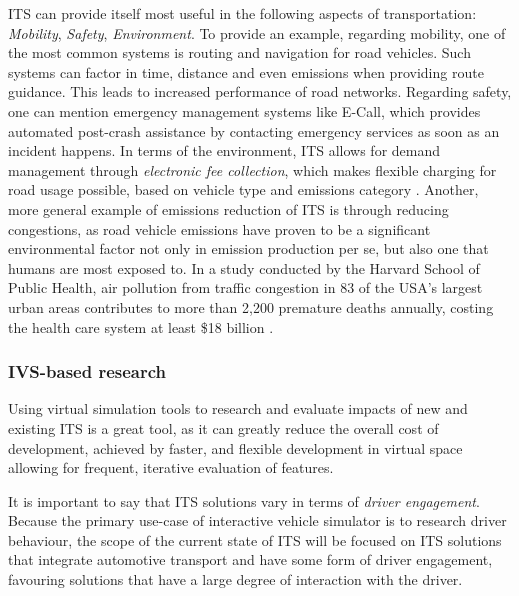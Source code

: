 \documentclass[main.tex]{subfiles}
\begin{document}
ITS can provide itself most useful in the following aspects of transportation: 
\emph{Mobility}, \emph{Safety}, \emph{Environment}. To provide an example, regarding mobility, 
one of the most common systems is routing and navigation for road vehicles. Such systems can 
factor in time, distance and even emissions when providing route guidance. This leads to 
increased performance of road networks. Regarding safety, one can mention emergency management
systems like E-Call, which provides automated post-crash assistance by contacting emergency
services as soon as an incident happens. In terms of the environment, 
ITS allows for demand management through \emph{electronic fee collection}, which makes flexible 
charging for road usage possible, based on vehicle type and emissions category \cite{Commision2022}.
Another, more general example of emissions reduction of ITS is through reducing congestions, as road vehicle 
emissions have proven to be a significant environmental factor not only in emission production
per se, but also one that humans are most exposed to. In a study conducted by the Harvard
School of Public Health, air pollution from traffic congestion in 83 of the USA's largest urban
areas contributes to more than 2,200 premature deaths annually, costing the health care system at
least \$18 billion \cite{Levy2011}.

\subsubsection{IVS-based research}

Using virtual simulation tools to research and evaluate impacts of new and existing ITS 
is a great tool, as it can greatly reduce the overall cost of development, achieved by faster, 
and flexible development in virtual space allowing for frequent, iterative evaluation of features.

It is important to say that ITS solutions vary in terms of \emph{driver engagement}. Because
the primary use-case of interactive vehicle simulator is to research driver behaviour, the 
scope of the current state of ITS will be focused on ITS solutions that integrate automotive 
transport and have some form of driver engagement, favouring solutions that have a large degree 
of interaction with the driver.
\end{document}
